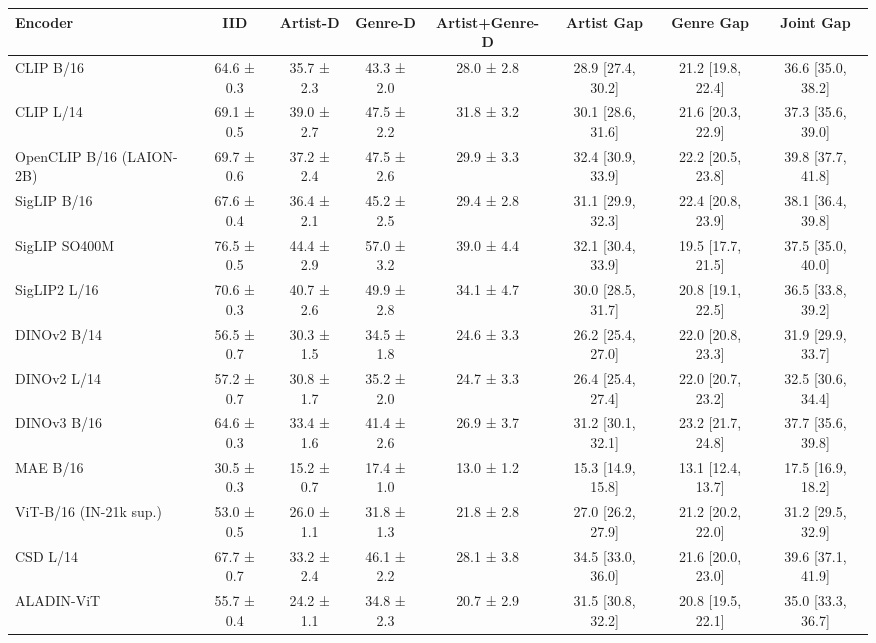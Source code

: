 \begin{tabular}{lccccccc}
\toprule
Encoder & IID & Artist-D & Genre-D & Artist+Genre-D & Artist Gap & Genre Gap & Joint Gap \\
\midrule
CLIP B/16 & 64.6 ± 0.3 & 35.7 ± 2.3 & 43.3 ± 2.0 & 28.0 ± 2.8 & 28.9 [27.4, 30.2] & 21.2 [19.8, 22.4] & 36.6 [35.0, 38.2] \\
CLIP L/14 & 69.1 ± 0.5 & 39.0 ± 2.7 & 47.5 ± 2.2 & 31.8 ± 3.2 & 30.1 [28.6, 31.6] & 21.6 [20.3, 22.9] & 37.3 [35.6, 39.0] \\
OpenCLIP B/16 (LAION-2B) & 69.7 ± 0.6 & 37.2 ± 2.4 & 47.5 ± 2.6 & 29.9 ± 3.3 & 32.4 [30.9, 33.9] & 22.2 [20.5, 23.8] & 39.8 [37.7, 41.8] \\
SigLIP B/16 & 67.6 ± 0.4 & 36.4 ± 2.1 & 45.2 ± 2.5 & 29.4 ± 2.8 & 31.1 [29.9, 32.3] & 22.4 [20.8, 23.9] & 38.1 [36.4, 39.8] \\
SigLIP SO400M & 76.5 ± 0.5 & 44.4 ± 2.9 & 57.0 ± 3.2 & 39.0 ± 4.4 & 32.1 [30.4, 33.9] & 19.5 [17.7, 21.5] & 37.5 [35.0, 40.0] \\
SigLIP2 L/16 & 70.6 ± 0.3 & 40.7 ± 2.6 & 49.9 ± 2.8 & 34.1 ± 4.7 & 30.0 [28.5, 31.7] & 20.8 [19.1, 22.5] & 36.5 [33.8, 39.2] \\
DINOv2 B/14 & 56.5 ± 0.7 & 30.3 ± 1.5 & 34.5 ± 1.8 & 24.6 ± 3.3 & 26.2 [25.4, 27.0] & 22.0 [20.8, 23.3] & 31.9 [29.9, 33.7] \\
DINOv2 L/14 & 57.2 ± 0.7 & 30.8 ± 1.7 & 35.2 ± 2.0 & 24.7 ± 3.3 & 26.4 [25.4, 27.4] & 22.0 [20.7, 23.2] & 32.5 [30.6, 34.4] \\
DINOv3 B/16 & 64.6 ± 0.3 & 33.4 ± 1.6 & 41.4 ± 2.6 & 26.9 ± 3.7 & 31.2 [30.1, 32.1] & 23.2 [21.7, 24.8] & 37.7 [35.6, 39.8] \\
MAE B/16 & 30.5 ± 0.3 & 15.2 ± 0.7 & 17.4 ± 1.0 & 13.0 ± 1.2 & 15.3 [14.9, 15.8] & 13.1 [12.4, 13.7] & 17.5 [16.9, 18.2] \\
ViT-B/16 (IN-21k sup.) & 53.0 ± 0.5 & 26.0 ± 1.1 & 31.8 ± 1.3 & 21.8 ± 2.8 & 27.0 [26.2, 27.9] & 21.2 [20.2, 22.0] & 31.2 [29.5, 32.9] \\
CSD L/14 & 67.7 ± 0.7 & 33.2 ± 2.4 & 46.1 ± 2.2 & 28.1 ± 3.8 & 34.5 [33.0, 36.0] & 21.6 [20.0, 23.0] & 39.6 [37.1, 41.9] \\
ALADIN-ViT & 55.7 ± 0.4 & 24.2 ± 1.1 & 34.8 ± 2.3 & 20.7 ± 2.9 & 31.5 [30.8, 32.2] & 20.8 [19.5, 22.1] & 35.0 [33.3, 36.7] \\
\bottomrule
\end{tabular}

